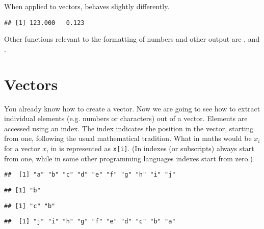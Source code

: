 \documentclass[paper=a4,headsepline,BCOR=12mm,twoside,open=right,%
titlepage,headings=small,fontsize=10pt,index=totoc,bibliography=totoc,%
captions=tableheading,captions=nooneline]{scrbook}\usepackage{knitr}
\begin{document}
When applied to vectors,  behaves slightly differently.

\begin{knitrout}\footnotesize
{}\color{fgcolor}\begin{kframe}
\begin{alltt}
\hlstd{(}\hlstd{(}\hlstd{,} \hlstd{),} \hlstd{)}
\end{alltt}
\begin{verbatim}
## [1] 123.000   0.123
\end{verbatim}
\end{kframe}
\end{knitrout}

Other functions relevant to the formatting of numbers and other output are , and .

\section{Vectors}

You already know how to create a vector. Now we are going to see how to extract individual elements (e.g. numbers or characters) out of a vector. Elements are accessed using an index. The index indicates the position in the vector, starting from one, following the usual mathematical tradition. What in maths would be $x_i$ for a vector $x$, in \R is represented as \texttt{x[i]}. (In \R indexes (or subscripts) always start from one, while in some other programming languages indexes start from zero.)

\begin{knitrout}\footnotesize
{}\color{fgcolor}\begin{kframe}
\begin{alltt}
 \hlkwb{<-} \hlstd{letters[}\hlopt{:}\hlstd{]}
\end{alltt}
\begin{verbatim}
##  [1] "a" "b" "c" "d" "e" "f" "g" "h" "i" "j"
\end{verbatim}
\begin{alltt}
\hlstd{a[}\hlstd{]}
\end{alltt}
\begin{verbatim}
## [1] "b"
\end{verbatim}
\begin{alltt}
\hlstd{a[}\hlstd{(}\hlstd{,}\hlstd{)]}
\end{alltt}
\begin{verbatim}
## [1] "c" "b"
\end{verbatim}
\begin{alltt}
\hlstd{a[}\hlopt{:}\hlstd{]}
\end{alltt}
\begin{verbatim}
##  [1] "j" "i" "h" "g" "f" "e" "d" "c" "b" "a"
\end{verbatim}
\end{kframe}
\end{knitrout}
\end{document}
